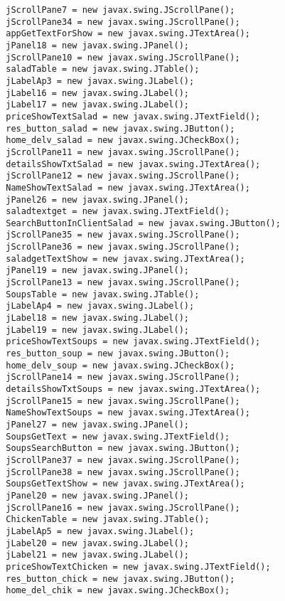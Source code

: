 \documentclass[12pt,a4paper]{article}
\begin{document}
\begin{lstlisting}
        jScrollPane7 = new javax.swing.JScrollPane();
        jScrollPane34 = new javax.swing.JScrollPane();
        appGetTextForShow = new javax.swing.JTextArea();
        jPanel18 = new javax.swing.JPanel();
        jScrollPane10 = new javax.swing.JScrollPane();
        saladTable = new javax.swing.JTable();
        jLabelAp3 = new javax.swing.JLabel();
        jLabel16 = new javax.swing.JLabel();
        jLabel17 = new javax.swing.JLabel();
        priceShowTextSalad = new javax.swing.JTextField();
        res_button_salad = new javax.swing.JButton();
        home_delv_salad = new javax.swing.JCheckBox();
        jScrollPane11 = new javax.swing.JScrollPane();
        detailsShowTxtSalad = new javax.swing.JTextArea();
        jScrollPane12 = new javax.swing.JScrollPane();
        NameShowTextSalad = new javax.swing.JTextArea();
        jPanel26 = new javax.swing.JPanel();
        saladtextget = new javax.swing.JTextField();
        SearchButtonInClientSalad = new javax.swing.JButton();
        jScrollPane35 = new javax.swing.JScrollPane();
        jScrollPane36 = new javax.swing.JScrollPane();
        saladgetTextShow = new javax.swing.JTextArea();
        jPanel19 = new javax.swing.JPanel();
        jScrollPane13 = new javax.swing.JScrollPane();
        SoupsTable = new javax.swing.JTable();
        jLabelAp4 = new javax.swing.JLabel();
        jLabel18 = new javax.swing.JLabel();
        jLabel19 = new javax.swing.JLabel();
        priceShowTextSoups = new javax.swing.JTextField();
        res_button_soup = new javax.swing.JButton();
        home_delv_soup = new javax.swing.JCheckBox();
        jScrollPane14 = new javax.swing.JScrollPane();
        detailsShowTxtSoups = new javax.swing.JTextArea();
        jScrollPane15 = new javax.swing.JScrollPane();
        NameShowTextSoups = new javax.swing.JTextArea();
        jPanel27 = new javax.swing.JPanel();
        SoupsGetText = new javax.swing.JTextField();
        SoupsSearchButton = new javax.swing.JButton();
        jScrollPane37 = new javax.swing.JScrollPane();
        jScrollPane38 = new javax.swing.JScrollPane();
        SoupsGetTextShow = new javax.swing.JTextArea();
        jPanel20 = new javax.swing.JPanel();
        jScrollPane16 = new javax.swing.JScrollPane();
        ChickenTable = new javax.swing.JTable();
        jLabelAp5 = new javax.swing.JLabel();
        jLabel20 = new javax.swing.JLabel();
        jLabel21 = new javax.swing.JLabel();
        priceShowTextChicken = new javax.swing.JTextField();
        res_button_chick = new javax.swing.JButton();
        home_del_chik = new javax.swing.JCheckBox();

\end{lstlisting}
\end{document}
